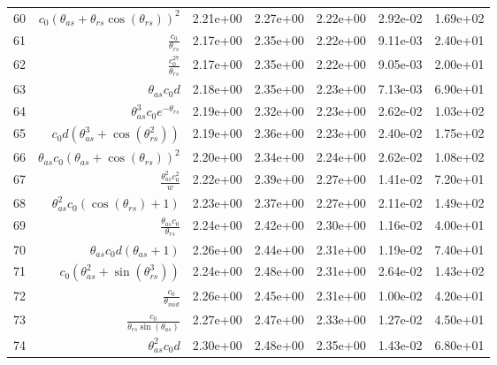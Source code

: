 \begin{tabularx}{\textwidth}{lRRRRRl}
60  &  $ c_{0} \left(\theta_{as} + \theta_{rs} \cos{\left(\theta_{rs} \right)}\right)^{2} $  &  2.21e+00  &  2.27e+00  &  2.22e+00  &  2.92e-02  &  1.69e+02  \\ 
61  &  $ \displaystyle\frac{c_{0}}{\theta_{rs}} $  &  2.17e+00  &  2.35e+00  &  2.22e+00  &  9.11e-03  &  2.40e+01  \\ 
62  &  $ \displaystyle\frac{c_{0}^{27}}{\theta_{rs}} $  &  2.17e+00  &  2.35e+00  &  2.22e+00  &  9.05e-03  &  2.00e+01  \\ 
63  &  $ \theta_{as} c_{0} d $  &  2.18e+00  &  2.35e+00  &  2.23e+00  &  7.13e-03  &  6.90e+01  \\ 
64  &  $ \theta_{as}^{3} c_{0} e^{- \theta_{rs}} $  &  2.19e+00  &  2.32e+00  &  2.23e+00  &  2.62e-02  &  1.03e+02  \\ 
65  &  $ c_{0} d \left(\theta_{as}^{3} + \cos{\left(\theta_{rs}^{2} \right)}\right) $  &  2.19e+00  &  2.36e+00  &  2.23e+00  &  2.40e-02  &  1.75e+02  \\ 
66  &  $ \theta_{as} c_{0} \left(\theta_{as} + \cos{\left(\theta_{rs} \right)}\right)^{2} $  &  2.20e+00  &  2.34e+00  &  2.24e+00  &  2.62e-02  &  1.08e+02  \\ 
67  &  $ \displaystyle\frac{\theta_{as}^{2} c_{0}^{2}}{w} $  &  2.22e+00  &  2.39e+00  &  2.27e+00  &  1.41e-02  &  7.20e+01  \\ 
68  &  $ \theta_{as}^{2} c_{0} \left(\cos{\left(\theta_{rs} \right)} + 1\right) $  &  2.23e+00  &  2.37e+00  &  2.27e+00  &  2.11e-02  &  1.49e+02  \\ 
69  &  $ \displaystyle\frac{\theta_{as} c_{0}}{\theta_{rs}} $  &  2.24e+00  &  2.42e+00  &  2.30e+00  &  1.16e-02  &  4.00e+01  \\ 
70  &  $ \theta_{as} c_{0} d \left(\theta_{as} + 1\right) $  &  2.26e+00  &  2.44e+00  &  2.31e+00  &  1.19e-02  &  7.40e+01  \\ 
71  &  $ c_{0} \left(\theta_{as}^{2} + \sin{\left(\theta_{rs}^{3} \right)}\right) $  &  2.24e+00  &  2.48e+00  &  2.31e+00  &  2.64e-02  &  1.43e+02  \\ 
72  &  $ \displaystyle\frac{c_{0}}{\theta_{mid}} $  &  2.26e+00  &  2.45e+00  &  2.31e+00  &  1.00e-02  &  4.20e+01  \\ 
73  &  $ \displaystyle\frac{c_{0}}{\theta_{rs} \sin{\left(\theta_{as} \right)}} $  &  2.27e+00  &  2.47e+00  &  2.33e+00  &  1.27e-02  &  4.50e+01  \\ 
74  &  $ \theta_{as}^{2} c_{0} d $  &  2.30e+00  &  2.48e+00  &  2.35e+00  &  1.43e-02  &  6.80e+01  \\ 

\end{tabularx}
